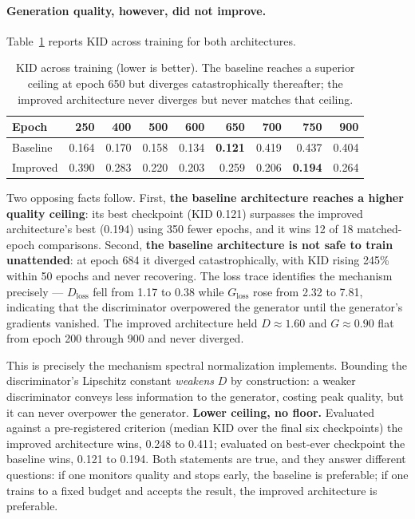 \paragraph{Generation quality, however, did not improve.} Table~\ref{tab:ddsm_kid} reports KID across
training for both architectures.

\begin{table}[h]
\centering
\caption{KID across training (lower is better). The baseline reaches a superior ceiling at epoch 650
but diverges catastrophically thereafter; the improved architecture never diverges but never matches
that ceiling.}
\label{tab:ddsm_kid}
\begin{tabular}{lrrrrrrrr}
\toprule
\textbf{Epoch} & 250 & 400 & 500 & 600 & 650 & 700 & 750 & 900 \\
\midrule
Baseline & 0.164 & 0.170 & 0.158 & 0.134 & \textbf{0.121} & 0.419 & 0.437 & 0.404 \\
Improved & 0.390 & 0.283 & 0.220 & 0.203 & 0.259 & 0.206 & \textbf{0.194} & 0.264 \\
\bottomrule
\end{tabular}
\end{table}

Two opposing facts follow. First, \textbf{the baseline architecture reaches a higher quality ceiling}:
its best checkpoint (KID 0.121) surpasses the improved architecture's best (0.194) using 350 fewer
epochs, and it wins 12 of 18 matched-epoch comparisons. Second, \textbf{the baseline architecture is
not safe to train unattended}: at epoch 684 it diverged catastrophically, with KID rising 245\% within
50 epochs and never recovering. The loss trace identifies the mechanism precisely --- $D_{\text{loss}}$
fell from 1.17 to 0.38 while $G_{\text{loss}}$ rose from 2.32 to 7.81, indicating that the
discriminator overpowered the generator until the generator's gradients vanished. The improved
architecture held $D \approx 1.60$ and $G \approx 0.90$ flat from epoch 200 through 900 and never
diverged.

This is precisely the mechanism spectral normalization implements. Bounding the discriminator's
Lipschitz constant \emph{weakens} $D$ by construction: a weaker discriminator conveys less information
to the generator, costing peak quality, but it can never overpower the generator.
\textbf{Lower ceiling, no floor.} Evaluated against a pre-registered criterion (median KID over the
final six checkpoints) the improved architecture wins, 0.248 to 0.411; evaluated on best-ever
checkpoint the baseline wins, 0.121 to 0.194. Both statements are true, and they answer different
questions: if one monitors quality and stops early, the baseline is preferable; if one trains to a
fixed budget and accepts the result, the improved architecture is preferable.

